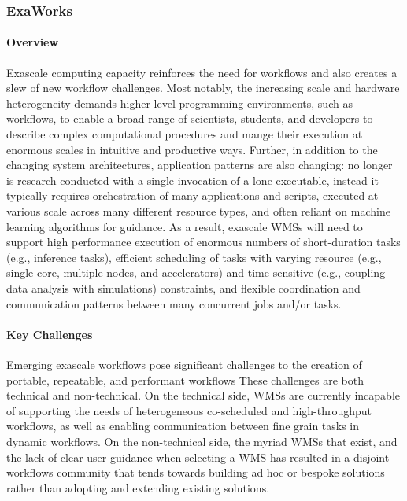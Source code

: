 \subsubsection{ ExaWorks} \label{subsubsect:exaworks}


\paragraph{Overview} Exascale computing capacity reinforces the need for workflows and also creates
a slew of new workflow challenges. Most notably, the increasing scale and
hardware heterogeneity demands higher level programming environments,
such as workflows, to enable a broad range of scientists, students, and
developers to describe complex computational procedures and mange their
execution at enormous scales in intuitive and productive ways. Further, in
addition to the changing system architectures, application patterns are also
changing: no longer is research conducted with a single invocation of a 
lone executable, instead it typically requires orchestration of many 
applications and scripts, executed at various scale across many different
resource types, and often reliant on machine learning algorithms for guidance.
As a result, exascale WMSs will need to support high performance execution of
enormous numbers of short-duration tasks (e.g., inference tasks), efficient
scheduling of tasks with varying resource (e.g., single core, multiple nodes,
and accelerators) and time-sensitive (e.g., coupling data analysis with
simulations) constraints, and flexible coordination and communication patterns between
many concurrent jobs and/or tasks.


\paragraph{Key Challenges}
Emerging exascale workflows pose significant
challenges to the creation of portable, repeatable, and performant workflows
These
challenges are both technical and non-technical. On the technical side, WMSs
are currently incapable of supporting the needs of heterogeneous co-scheduled
and high-throughput workflows, as well as enabling communication between fine
grain tasks in dynamic workflows. On the non-technical side, the myriad WMSs
that exist, and the lack of clear user guidance when selecting a WMS has resulted
in a disjoint workflows community that tends towards building ad hoc or
bespoke solutions rather than adopting and extending existing solutions. 

